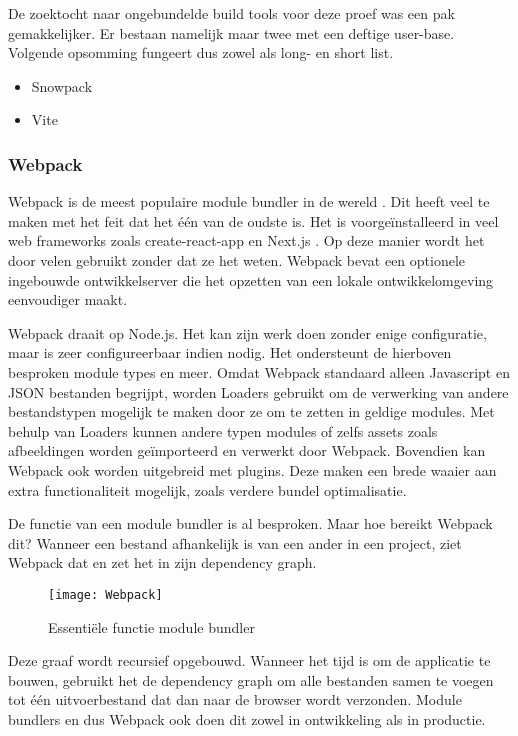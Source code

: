 De zoektocht naar ongebundelde build tools voor deze proef was een pak gemakkelijker. Er bestaan namelijk maar twee met een deftige user-base. Volgende opsomming fungeert dus zowel als long- en short list.

\begin{itemize}
\item Snowpack
\item Vite
\end{itemize}

\subsubsection{Webpack}

Webpack is de meest populaire module bundler in de wereld \autocite{stateofjs-2020}. Dit heeft veel te maken met het feit dat het één van de oudste is. Het is voorgeïnstalleerd in veel \gls{web frameworks} zoals create-react-app \autocite{facebook-2021} en Next.js \autocite{vercel-no-date}. Op deze manier wordt het door velen gebruikt zonder dat ze het weten. Webpack bevat een optionele ingebouwde ontwikkelserver die het opzetten van een lokale ontwikkelomgeving eenvoudiger maakt.

Webpack draait op Node.js. Het kan zijn werk doen zonder enige configuratie, maar is zeer configureerbaar indien nodig. Het ondersteunt de hierboven besproken module types en meer. Omdat Webpack standaard alleen \gls{Javascript} en JSON bestanden begrijpt, worden Loaders gebruikt om de verwerking van andere bestandstypen mogelijk te maken door ze om te zetten in geldige modules. Met behulp van Loaders kunnen andere typen modules of zelfs assets zoals afbeeldingen worden geïmporteerd en verwerkt door Webpack. Bovendien kan Webpack ook worden uitgebreid met plugins. Deze maken een brede waaier aan extra functionaliteit mogelijk, zoals verdere bundel optimalisatie. 

De functie van een module bundler is al besproken. Maar hoe bereikt Webpack dit? Wanneer een bestand afhankelijk is van een ander in een project, ziet Webpack dat en zet het in zijn dependency graph.

\begin{figure}[h]
\texttt{[image: Webpack]}
   \caption{Essentiële functie module bundler \autocite{webpack-no-date}}
\end{figure}

Deze graaf wordt recursief opgebouwd. Wanneer het tijd is om de applicatie te bouwen, gebruikt het de dependency graph om alle bestanden samen te voegen tot één uitvoerbestand dat dan naar de browser wordt verzonden. Module bundlers en dus Webpack ook doen dit zowel in ontwikkeling als in productie.


